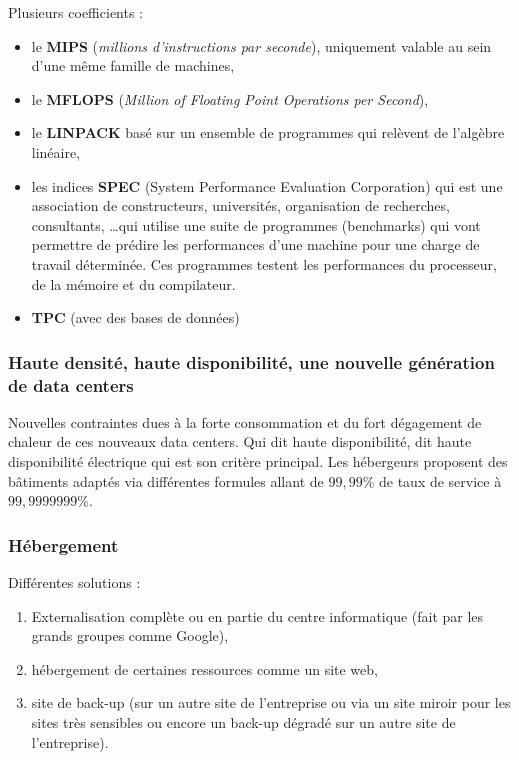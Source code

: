 \documentclass[10pt,a4paper,oneside,titlepage]{report}
\begin{document}
Plusieurs coefficients : \begin{itemize}
\item le \textbf{MIPS} (\textit{millions d'instructions par seconde}),
uniquement valable au sein d'une m\^eme famille de machines,
\item le \textbf{MFLOPS} (\textit{Million of Floating Point Operations per
Second}),
\item le \textbf{LINPACK} basé sur un ensemble de programmes qui relèvent de
l'algèbre linéaire,
\item les indices \textbf{SPEC} (System Performance Evaluation Corporation) qui
est une association de constructeurs, universités, organisation de recherches,
consultants, \dots qui utilise une suite de programmes (benchmarks) qui vont
permettre de prédire les performances d'une machine pour une charge de travail
déterminée. Ces programmes testent les performances du processeur, de la mémoire
et du compilateur.
\item \textbf{TPC} (avec des bases de données)
\end{itemize}

\subsubsection{Haute densité, haute disponibilité, une nouvelle génération de
data centers}

Nouvelles contraintes dues à la forte consommation et du fort dégagement de
chaleur de ces nouveaux data centers. Qui dit haute disponibilité, dit haute
disponibilité électrique qui est son critère principal. Les hébergeurs proposent
des bâtiments adaptés via différentes formules allant de $99,99 \%$ de taux de
service à $99,9999999 \%$.

\subsubsection{Hébergement}

Différentes solutions :
\begin{enumerate}
\item Externalisation complète ou en partie du centre informatique (fait par
les grands groupes comme Google),
\item hébergement de certaines ressources comme un site web,
\item site de back-up (sur un autre site de l'entreprise ou via un site miroir
pour les sites très sensibles ou encore un back-up dégradé sur un autre site de
l'entreprise).
\end{enumerate}
\end{document}
